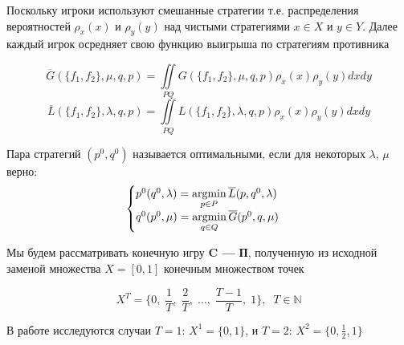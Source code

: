 \begin{flushleft}
Поскольку игроки используют смешанные стратегии т.е. распределения вероятностей
$\rho_x(x)$ и $\rho_y(y)$ над чистыми стратегиями $x \in X$ и $y \in Y$. 
Далее каждый игрок осредняет свою функцию выигрыша по стратегиям противника

$$ \overline G(\{f_1, f_2\}, \mu, q, p) = 
\iint \limits_{PQ} G(\{f_1, f_2\}, \mu, q, p) \rho_x(x) \rho_y(y)dxdy$$
$$ \overline L(\{f_1, f_2\}, \lambda, q, p) = 
\iint \limits_{PQ} L(\{f_1, f_2\}, \lambda, q, p) \rho_x(x) \rho_y(y)dxdy$$



\begin{Def}
	Пара стратегий $(p^0, q^0)$ называется оптимальными, если для некоторых 
	$\lambda$, $\mu$ верно:
	\begin{equation}
		\begin{cases} 
		p^0(q^0, \lambda) = \operatorname*{argmin}\limits_{p \in P} \overline L(p, q^0, \lambda) \\ 
		q^0(p^0, \mu) = \operatorname*{argmin}\limits_{q \in Q} \overline G(p^0, q, \mu) \\
	\end{cases}
\end{equation}
\end{Def}

Мы будем рассматривать конечную игру \textbf{C --- П}, полученную из исходной 
заменой множества $X=[0,1]$ конечным множеством точек

$$X^T = \{
	0, \; \frac{1}{T}, \; \frac{2}{T}, \; \ldots, \; \frac{T-1}{T}, \; 1
\}, \;\; T \in \mathbb{N}$$

В работе исследуются случаи $T=1$: $X^1=\{0, 1\}$, 
и $T=2$: $X^2=\{0, \frac{1}{2} ,1\}$



\end{flushleft}